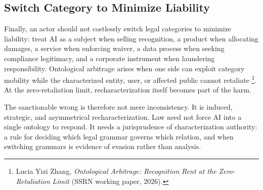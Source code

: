 \documentclass{lawreview}
\begin{document}
    \subsection{Switch Category to Minimize Liability}

    Finally, an actor should not costlessly switch legal categories to minimize liability: treat AI as a subject when selling recognition, a product when allocating damages, a service when enforcing waiver, a data process when seeking compliance legitimacy, and a corporate instrument when laundering responsibility. Ontological arbitrage arises when one side can exploit category mobility while the characterized entity, user, or affected public cannot retaliate \footnote{Lucia Yizi Zhang, \emph{Ontological Arbitrage: Recognition Rent at the Zero-Retaliation Limit} (SSRN working paper, 2026).}. At the zero-retaliation limit, recharacterization itself becomes part of the harm.

    The sanctionable wrong is therefore not mere inconsistency. It is induced, strategic, and asymmetrical recharacterization. Law need not force AI into a single ontology to respond. It needs a jurisprudence of characterization authority: a rule for deciding which legal grammar governs which relation, and when switching grammars is evidence of evasion rather than analysis.
\end{document}

